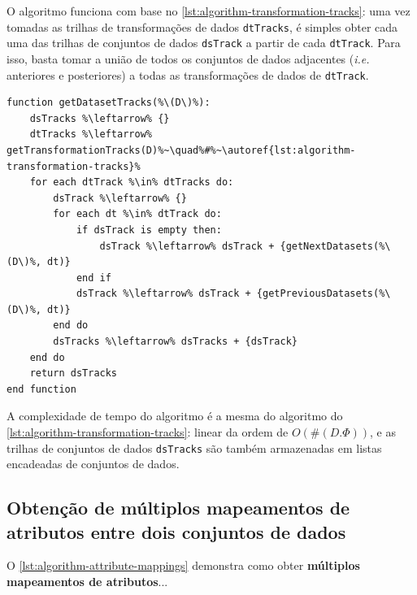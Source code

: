 O algoritmo funciona com base no \autoref{lst:algorithm-transformation-tracks}: uma vez tomadas as trilhas de transformações de dados \texttt{dtTracks}, é simples obter cada uma das trilhas de conjuntos de dados \texttt{dsTrack} a partir de cada \texttt{dtTrack}. Para isso, basta tomar a união de todos os conjuntos de dados adjacentes (\textit{i.e.} anteriores e posteriores) a todas as transformações de dados de \texttt{dtTrack}.

\begin{minipage}[c]{0.95\textwidth}
\begin{lstlisting}[language=pseudocode,label={lst:algorithm-dataset-tracks},caption={[Detecção das trilhas de conjuntos de dados]Detecção do rastro do fluxo de dados no nível de trilhas de conjuntos de dados.}]
function getDatasetTracks(%\(D\)%):
    dsTracks %\leftarrow% {}
    dtTracks %\leftarrow% getTransformationTracks(D)%~\quad%#%~\autoref{lst:algorithm-transformation-tracks}%
    for each dtTrack %\in% dtTracks do:
        dsTrack %\leftarrow% {}
        for each dt %\in% dtTrack do:
            if dsTrack is empty then:
                dsTrack %\leftarrow% dsTrack + {getNextDatasets(%\(D\)%, dt)}
            end if
            dsTrack %\leftarrow% dsTrack + {getPreviousDatasets(%\(D\)%, dt)}
        end do
        dsTracks %\leftarrow% dsTracks + {dsTrack}
    end do
    return dsTracks
end function
\end{lstlisting}
\end{minipage}

A complexidade de tempo do algoritmo é a mesma do algoritmo do \autoref{lst:algorithm-transformation-tracks}: linear da ordem de \( O(\#(D.\Phi)) \), e as trilhas de conjuntos de dados \texttt{dsTracks} são também armazenadas em listas encadeadas de conjuntos de dados.

\subsection{Obtenção de múltiplos mapeamentos de atributos entre dois conjuntos de dados}

O \autoref{lst:algorithm-attribute-mappings} demonstra como obter \textbf{múltiplos mapeamentos de atributos}...


